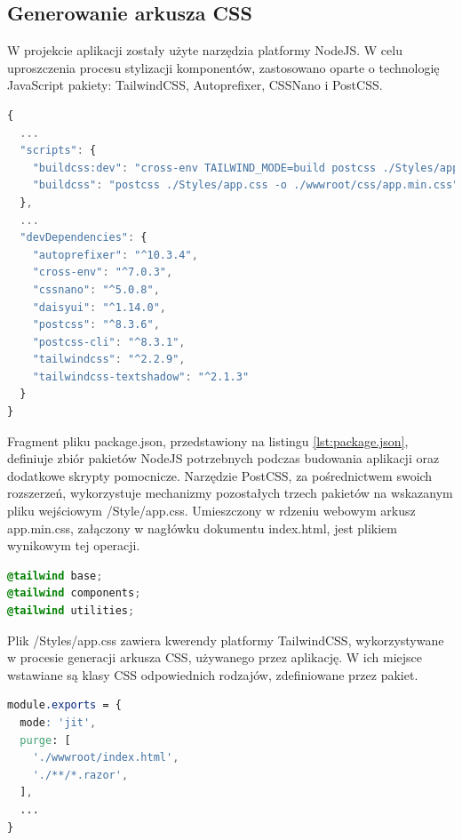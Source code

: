 \subsection{Generowanie arkusza CSS}

W projekcie aplikacji zostały użyte narzędzia platformy NodeJS. W celu uproszczenia procesu stylizacji komponentów, zastosowano oparte o technologię JavaScript pakiety: TailwindCSS, Autoprefixer, CSSNano i PostCSS. 

\begin{lstlisting}[language=JavaScript, caption={Plik package.json w aplikacji klienckiej}, label=lst:package.json]
{
  ...
  "scripts": {
    "buildcss:dev": "cross-env TAILWIND_MODE=build postcss ./Styles/app.css -o ./wwwroot/css/app.min.css",
    "buildcss": "postcss ./Styles/app.css -o ./wwwroot/css/app.min.css"
  },
  ...
  "devDependencies": {
    "autoprefixer": "^10.3.4",
    "cross-env": "^7.0.3",
    "cssnano": "^5.0.8",
    "daisyui": "^1.14.0",
    "postcss": "^8.3.6",
    "postcss-cli": "^8.3.1",
    "tailwindcss": "^2.2.9",
    "tailwindcss-textshadow": "^2.1.3"
  }
}
\end{lstlisting}

Fragment pliku package.json, przedstawiony na listingu \ref{lst:package.json}, definiuje zbiór pakietów NodeJS potrzebnych podczas budowania aplikacji oraz dodatkowe skrypty pomocnicze. Narzędzie PostCSS, za pośrednictwem swoich rozszerzeń, wykorzystuje mechanizmy pozostałych trzech pakietów na wskazanym pliku wejściowym /Style/app.css. Umieszczony w rdzeniu webowym arkusz app.min.css, załączony w nagłówku dokumentu index.html, jest plikiem wynikowym tej operacji.

\begin{lstlisting}[language=CSS, caption={Plik /Styles/app.css w aplikacji klienckiej}, label=lst:app.css]
@tailwind base;
@tailwind components;
@tailwind utilities;
\end{lstlisting}

Plik /Styles/app.css zawiera kwerendy platformy TailwindCSS, wykorzystywane w procesie generacji arkusza CSS, używanego przez aplikację. W ich miejsce wstawiane są klasy CSS odpowiednich rodzajów, zdefiniowane przez pakiet.

\begin{lstlisting}[language=CSS, caption={Konfiguracja narzędzia TailwindCSS w pliku tailwind.config.js}, label=lst:tailwind]
module.exports = {
  mode: 'jit',
  purge: [
    './wwwroot/index.html',
    './**/*.razor',
  ],
  ...
}
\end{lstlisting}

